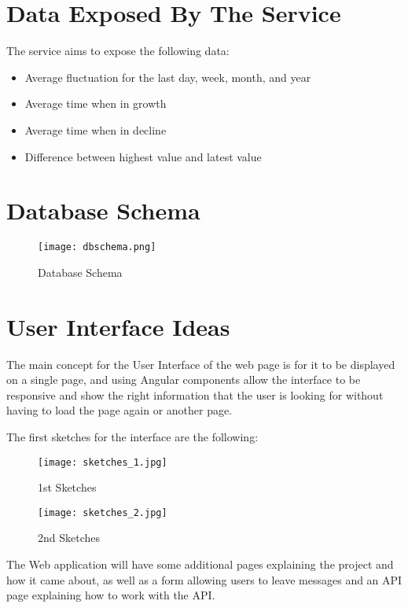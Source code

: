 \section{Data Exposed By The Service}
The service aims to expose the following data:
\begin{itemize}
    \item Average fluctuation for the last day, week, month, and year
    \item Average time when in growth
    \item Average time when in decline
    \item Difference between highest value and latest value
\end{itemize}
\section{Database Schema}
\begin{figure}
  \caption{Database Schema}
  \centering
  \texttt{[image: dbschema.png]}
\end{figure}


\section{User Interface Ideas}
The main concept for the User Interface of the web page is for it to be displayed on a single page, and using Angular components allow the interface to be responsive and show the right information that the user is looking for without having to load the page again or another page.

The first sketches for the interface are the following:
\begin{figure}
    \caption{1st Sketches}
    \centering
    \texttt{[image: sketches\_1.jpg]}
\end{figure}
\begin{figure}
    \caption{2nd Sketches}
    \centering
    \texttt{[image: sketches\_2.jpg]}
\end{figure}

The Web application will have some additional pages explaining the project and how it came about, as well as a form allowing users to leave messages and an API page explaining how to work with the API.

